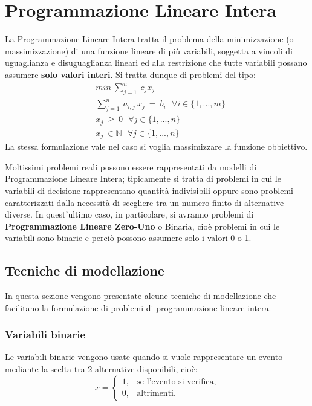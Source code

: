\section{Programmazione Lineare Intera}
La Programmazione Lineare Intera tratta il problema della minimizzazione (o massimizzazione) di una funzione lineare di più variabili, soggetta a vincoli di uguaglianza e disuguaglianza lineari ed alla restrizione che tutte variabili possano assumere \textbf{solo valori interi}. Si tratta dunque di problemi del tipo:
\begin{equation}
\begin{split}
& min ~ \sum_{j=1}^n ~ c_j x_j \\
& \sum_{j=1}^n ~ a_{i, j} ~ x_j ~ = ~ b_i ~~~ \forall i \in \{1,...,m\} \\
& x_j ~ \geq ~ 0 ~~~ \forall j \in \{1,...,n\} \\
& x_j ~ \in \mathbb{N} ~~~ \forall j \in \{1,...,n\}
\end{split}
\end{equation}
La stessa formulazione vale nel caso si voglia massimizzare la funzione obbiettivo.

Moltissimi problemi reali possono essere rappresentati da modelli di Programmazione Lineare Intera; tipicamente si tratta di problemi in cui le variabili di decisione rappresentano quantità indivisibili oppure sono problemi caratterizzati dalla necessità di scegliere tra un numero finito di alternative diverse. In quest'ultimo caso, in particolare, si avranno problemi di \textbf{Programmazione Lineare Zero-Uno} o Binaria, cioè problemi in cui le variabili sono binarie e perciò possono assumere solo i valori 0 o 1.


\subsection{Tecniche di modellazione}
In questa sezione vengono presentate alcune tecniche di modellazione che facilitano la formulazione di problemi di programmazione lineare intera.

\subsubsection*{Variabili binarie}
Le variabili binarie vengono usate quando si vuole rappresentare un evento mediante la scelta tra 2 alternative disponibili, cioè:
\begin{equation}
\label{eq:varBinarie}
x=
\begin{cases}
1, & \text{se l'evento si verifica,} \\
0, & \text{altrimenti.}
\end{cases}
\end{equation}

